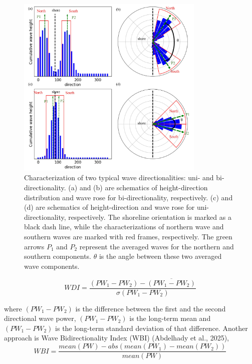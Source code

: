 \begin{figure}[htbp]
  \centering
  \includegraphics[width=0.8\textwidth]{chapter3/resources/figure3-2.jpg}
  \caption{Characterization of two typical wave directionalities: uni- and bi-directionality. (a) and (b) are schematics of height-direction distribution and wave rose for bi-directionality, respectively. (c) and (d) are schematics of height-direction and wave rose for uni-directionality, respectively. The shoreline orientation is marked as a black dash line, while the characterizations of northern wave and southern waves are marked with red frames, respectively. The green arrows $P_1$ and $P_2$ represent the averaged waves for the northern and southern components. $\theta$ is the angle between these two averaged wave components.}
  \label{fig:fig3.2}
\end{figure}

\begin{equation}
    WDI = \frac{(PW_1-PW_2) - \overline{(PW_1-PW_2)}}{\sigma(PW_1-PW_2)}
\label{eq:eq3.1}
\end{equation}

where $(PW_1-PW_2)$ is the difference between the first and the second directional wave power, $(PW_1-PW_2)$ is the long-term mean and $(PW_1-PW_2)$ is the long-term standard deviation of that difference. Another approach is Wave Bidirectionality Index (WBI) (Abdelhady et al., 2025),
\begin{equation}
    WBI = \frac{mean(PW) - abs(mean(PW_1)-mean(PW_2))}{mean(PW)}
\label{eq:eq3.2}
\end{equation}

